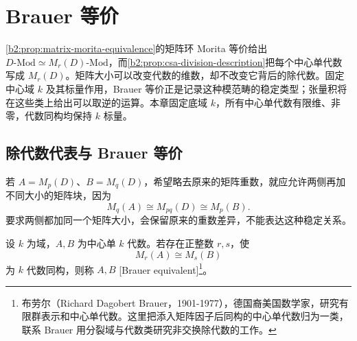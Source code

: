 
\section{Brauer 等价}
\label{b2:sec:1801}

\cref{b2:prop:matrix-morita-equivalence}的矩阵环 Morita 等价给出 \(D\text{-Mod}\simeq M_r(D)\text{-Mod}\)，而\cref{b2:prop:csa-division-description}把每个中心单代数写成 \(M_r(D)\)。矩阵大小可以改变代数的维数，却不改变它背后的除代数。固定中心域 \(k\) 及其标量作用，Brauer 等价正是记录这种模范畴的稳定类型；张量积将在这些类上给出可以取逆的运算。本章固定底域 \(k\)，所有中心单代数有限维、非零，代数同构均保持 \(k\) 标量。

%
%

\subsection{除代数代表与 Brauer 等价}
\label{b2:subsec:1801:01}

若 \(A=M_p(D)\)、\(B=M_q(D)\)，希望略去原来的矩阵重数，就应允许两侧再加不同大小的矩阵块，因为
\[
	M_q(A)\cong M_{pq}(D)\cong M_p(B).
\]
要求两侧都加同一个矩阵大小，会保留原来的重数差异，不能表达这种稳定关系。

\begin{definition}\label{b2:def:brauer-equivalence}
	设 \(k\) 为域，\(A,B\) 为中心单 \(k\) 代数。若存在正整数 \(r,s\)，使
	\[
		M_r(A)\cong M_s(B)
	\]
	为 \(k\) 代数同构，则称 \(A,B\) [Brauer equivalent]\footnote{布劳尔（Richard Dagobert Brauer，1901-1977），德国裔美国数学家，研究有限群表示和中心单代数。这里把添入矩阵因子后同构的中心单代数归为一类，联系 Brauer 用分裂域与代数类研究非交换除代数的工作。}。
\end{definition}


